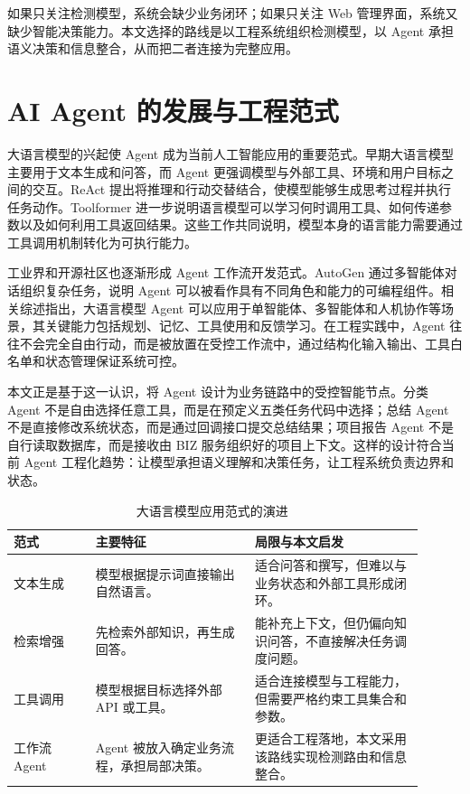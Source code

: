 如果只关注检测模型，系统会缺少业务闭环；如果只关注 Web 管理界面，系统又缺少智能决策能力。本文选择的路线是以工程系统组织检测模型，以 Agent 承担语义决策和信息整合，从而把二者连接为完整应用。

\section{AI Agent 的发展与工程范式}
\label{sec:related-agent-paradigm}

大语言模型的兴起使 Agent 成为当前人工智能应用的重要范式。早期大语言模型主要用于文本生成和问答，而 Agent 更强调模型与外部工具、环境和用户目标之间的交互。ReAct 提出将推理和行动交替结合，使模型能够生成思考过程并执行任务动作\cite{yao2023react}。Toolformer 进一步说明语言模型可以学习何时调用工具、如何传递参数以及如何利用工具返回结果\cite{schick2023toolformer}。这些工作共同说明，模型本身的语言能力需要通过工具调用机制转化为可执行能力。

工业界和开源社区也逐渐形成 Agent 工作流开发范式。AutoGen 通过多智能体对话组织复杂任务，说明 Agent 可以被看作具有不同角色和能力的可编程组件\cite{wu2023autogen}。相关综述指出，大语言模型 Agent 可以应用于单智能体、多智能体和人机协作等场景，其关键能力包括规划、记忆、工具使用和反馈学习\cite{wang2023llmagents}。在工程实践中，Agent 往往不会完全自由行动，而是被放置在受控工作流中，通过结构化输入输出、工具白名单和状态管理保证系统可控。

本文正是基于这一认识，将 Agent 设计为业务链路中的受控智能节点。分类 Agent 不是自由选择任意工具，而是在预定义五类任务代码中选择；总结 Agent 不是直接修改系统状态，而是通过回调接口提交总结结果；项目报告 Agent 不是自行读取数据库，而是接收由 BIZ 服务组织好的项目上下文。这样的设计符合当前 Agent 工程化趋势：让模型承担语义理解和决策任务，让工程系统负责边界和状态。

\begin{table}[!htb]
  \caption{大语言模型应用范式的演进}\label{tab:llm-agent-evolution}
  \centering
  \begin{tabular}{@{}p{0.18\linewidth}p{0.35\linewidth}p{0.37\linewidth}@{}} \toprule
    \textbf{范式} & \textbf{主要特征} & \textbf{局限与本文启发} \\ \midrule
    文本生成 & 模型根据提示词直接输出自然语言。 & 适合问答和撰写，但难以与业务状态和外部工具形成闭环。 \\
    检索增强 & 先检索外部知识，再生成回答。 & 能补充上下文，但仍偏向知识问答，不直接解决任务调度问题。 \\
    工具调用 & 模型根据目标选择外部 API 或工具。 & 适合连接模型与工程能力，但需要严格约束工具集合和参数。 \\
    工作流 Agent & Agent 被放入确定业务流程，承担局部决策。 & 更适合工程落地，本文采用该路线实现检测路由和信息整合。 \\ \bottomrule
  \end{tabular}
\end{table}


